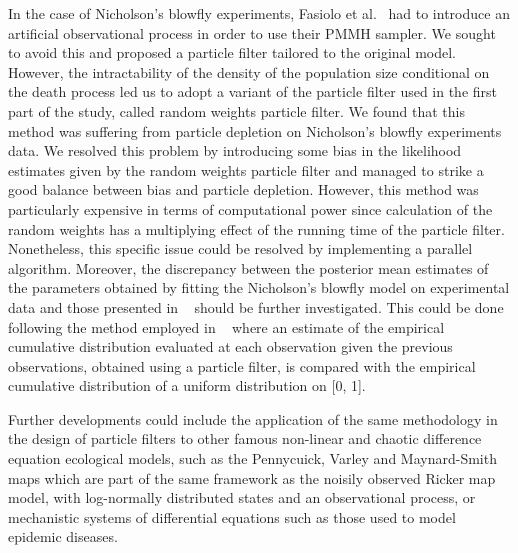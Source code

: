 \documentclass[12pt]{article}
\begin{document}
	In the case of Nicholson's blowfly experiments, Fasiolo et al.~\cite{fasiolo2014statistical} had to introduce an artificial observational process in order to use their PMMH sampler. We sought to avoid this and proposed a particle filter tailored to the original model. However, the intractability of the density of the population size conditional on the death process led us to adopt a variant of the particle filter used in the first part of the study, called random weights particle filter. We found that this method was suffering from particle depletion on Nicholson's blowfly experiments data. We resolved this problem by introducing some bias in the likelihood estimates given by the random weights particle filter and managed to strike a good balance between bias and particle depletion. However, this method was particularly expensive in terms of computational power since calculation of the random weights has a multiplying effect of the running time of the particle filter. Nonetheless, this specific issue could be resolved by implementing a parallel algorithm. Moreover, the discrepancy between the posterior mean estimates of the parameters obtained by fitting the Nicholson's blowfly model on experimental data and those presented in ~\cite{fasiolo2014statistical} should be further investigated. This could be done following the method employed in ~\cite{vermaak2002particle} where an estimate of the empirical cumulative distribution evaluated at each observation given the previous observations, obtained using a particle filter, is compared with the empirical cumulative distribution of a uniform distribution on [0, 1].
	
	Further developments could include the application of the same methodology in the design of particle filters to other famous non-linear and chaotic difference equation ecological models, such as the Pennycuick, Varley and Maynard-Smith maps which are part of the same framework as the noisily observed Ricker map model, with log-normally distributed states and an observational process, or mechanistic systems of differential equations such as those used to model epidemic diseases.
	
\clearpage

	
	{}
	
\end{document}
